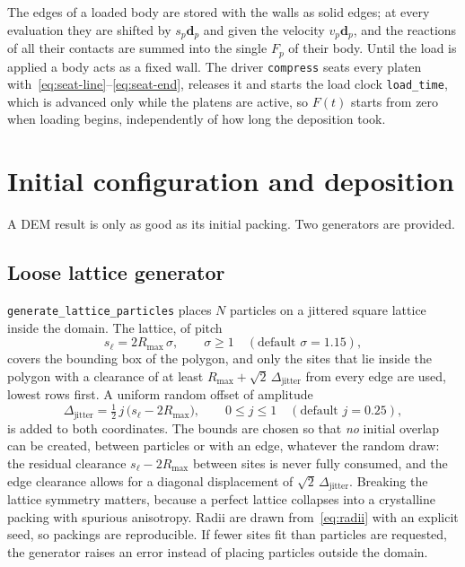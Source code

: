 The edges of a loaded body are stored with the walls as solid edges; at every
evaluation they are shifted by $s_{p}\mathbf{d}_{p}$ and given the velocity
$v_{p}\mathbf{d}_{p}$, and the reactions of all their contacts are summed into
the single $F_{p}$ of their body.  Until the load is applied a body acts as a
fixed wall.  The driver
\texttt{compress} seats every platen
with~\eqref{eq:seat-line}--\eqref{eq:seat-end}, releases it
and starts the load clock \texttt{load\_time}, which is advanced only while the
platens are active, so $F(t)$ starts from zero when loading begins,
independently of how long the deposition took.

\section{Initial configuration and deposition}
\label{sec:deposition}

A DEM result is only as good as its initial packing.  Two generators are
provided.

\subsection{Loose lattice generator}

\texttt{generate\_lattice\_particles} places $N$ particles on a jittered square
lattice inside the domain.  The lattice, of pitch
\begin{equation}
  s_{\ell} = 2 R_{\max}\,\sigma, \qquad \sigma \ge 1
  \quad(\text{default } \sigma = 1.15),
\end{equation}
covers the bounding box of the polygon, and only the sites that lie inside the
polygon with a clearance of at least $R_{\max}+\sqrt{2}\,\Delta_{\text{jitter}}$
from every edge are used, lowest rows first.  A uniform random offset of
amplitude
\begin{equation}
  \Delta_{\text{jitter}} = \tfrac{1}{2}\,j\,\bigl(s_{\ell} - 2R_{\max}\bigr),
  \qquad 0 \le j \le 1 \quad (\text{default } j = 0.25),
\end{equation}
is added to both coordinates.  The bounds are chosen so that \emph{no} initial
overlap can be created, between particles or with an edge, whatever the random
draw: the residual clearance $s_{\ell}-2R_{\max}$ between sites is never fully
consumed, and the edge clearance allows for a diagonal displacement of
$\sqrt{2}\,\Delta_{\text{jitter}}$.  Breaking the lattice symmetry matters,
because a perfect lattice collapses into a crystalline packing with spurious
anisotropy.  Radii are drawn from~\eqref{eq:radii} with an explicit seed, so
packings are reproducible.  If fewer sites fit than particles are requested, the
generator raises an error instead of placing particles outside the domain.

